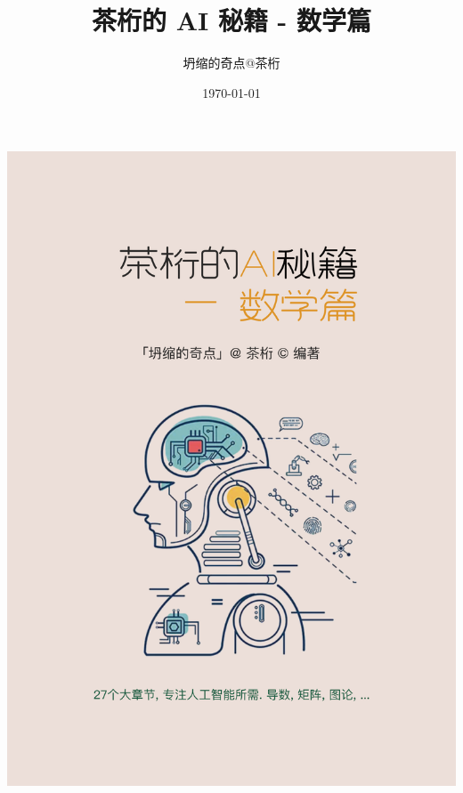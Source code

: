 \documentclass[oneside]{book}
\title{茶桁的 AI 秘籍 - 数学篇}
\author{坍缩的奇点@茶桁}
\date{\today}
\begin{document}

\begin{titlepage}
  \centering
  \includegraphics[width=\textwidth,height=\textheight, keepaspectratio]{Ebook_Cover-Math.png}
\end{titlepage}


\tableofcontents




























\end{document}
